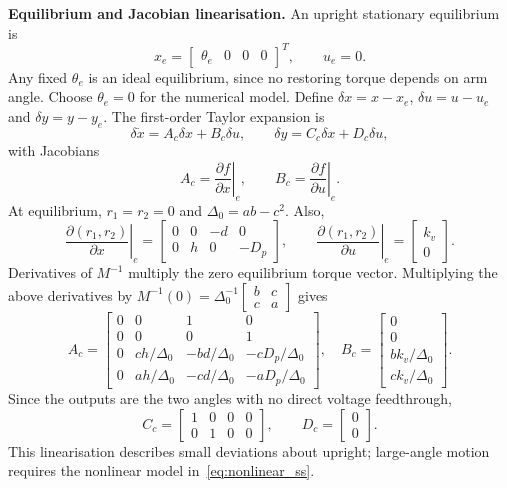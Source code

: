 \documentclass[11pt,a4paper]{article}
\begin{document}
\textbf{Equilibrium and Jacobian linearisation.}
An upright stationary equilibrium is
\begin{equation}
x_e=\begin{bmatrix}\theta_e&0&0&0\end{bmatrix}^{T},\qquad u_e=0.
\end{equation}
Any fixed $\theta_e$ is an ideal equilibrium, since no restoring torque
depends on arm angle. Choose $\theta_e=0$ for the numerical model.
Define $\delta x=x-x_e$, $\delta u=u-u_e$ and $\delta y=y-y_e$.
The first-order Taylor expansion is
\begin{equation}\label{eq:ct_ss}
\delta\dot x=A_c\delta x+B_c\delta u,\qquad
\delta y=C_c\delta x+D_c\delta u,
\end{equation}
with Jacobians
\begin{equation}
A_c=\left.\frac{\partial f}{\partial x}\right|_e,\qquad
B_c=\left.\frac{\partial f}{\partial u}\right|_e.
\end{equation}
At equilibrium, $r_1=r_2=0$ and $\Delta_0=ab-c^2$. Also,
\begin{equation}
\left.\frac{\partial(r_1,r_2)}{\partial x}\right|_e
=\begin{bmatrix}0&0&-d&0\\0&h&0&-D_p\end{bmatrix},\qquad
\left.\frac{\partial(r_1,r_2)}{\partial u}\right|_e
=\begin{bmatrix}k_v\\0\end{bmatrix}.
\end{equation}
Derivatives of $M^{-1}$ multiply the zero equilibrium torque vector.
Multiplying the above derivatives by
$M^{-1}(0)=\Delta_0^{-1}\begin{bmatrix}b&c\\c&a\end{bmatrix}$ gives
\begin{equation}\label{eq:Ac_symbolic}
\boxed{A_c=
\begin{bmatrix}
0&0&1&0\\0&0&0&1\\
0&ch/\Delta_0&-bd/\Delta_0&-cD_p/\Delta_0\\
0&ah/\Delta_0&-cd/\Delta_0&-aD_p/\Delta_0
\end{bmatrix},\quad
B_c=\begin{bmatrix}0\\0\\bk_v/\Delta_0\\ck_v/\Delta_0\end{bmatrix}.}
\end{equation}
Since the outputs are the two angles with no direct voltage feedthrough,
\begin{equation}\label{eq:CD}
\boxed{C_c=\begin{bmatrix}1&0&0&0\\0&1&0&0\end{bmatrix},
\qquad D_c=\begin{bmatrix}0\\0\end{bmatrix}.}
\end{equation}
This linearisation describes small deviations about upright; large-angle
motion requires the nonlinear model in~\eqref{eq:nonlinear_ss}.
\end{document}
